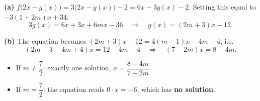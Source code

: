 \textbf{(a)} $f\bigl(2x-g(x)\bigr)=3\bigl(2x-g(x)\bigr)-2=6x-3g(x)-2$. Setting this equal to $-3(1+2m)x+34$:
\[
3g(x)=6x+3x+6mx-36\quad\Longrightarrow\quad \boxed{g(x)=(2m+3)x-12}.
\]

\textbf{(b)} The equation becomes $(2m+3)x-12=4(m-1)x-4m-4$, i.e.
\[
(2m+3-4m+4)x=12-4m-4\quad\Longrightarrow\quad (7-2m)x=8-4m .
\]
\begin{itemize}
\item If $m\ne\dfrac{7}{2}$: exactly one solution, $\boxed{x=\dfrac{8-4m}{7-2m}}$.
\item If $m=\dfrac{7}{2}$: the equation reads $0\cdot x=-6$, which has \textbf{no solution}.
\end{itemize}
